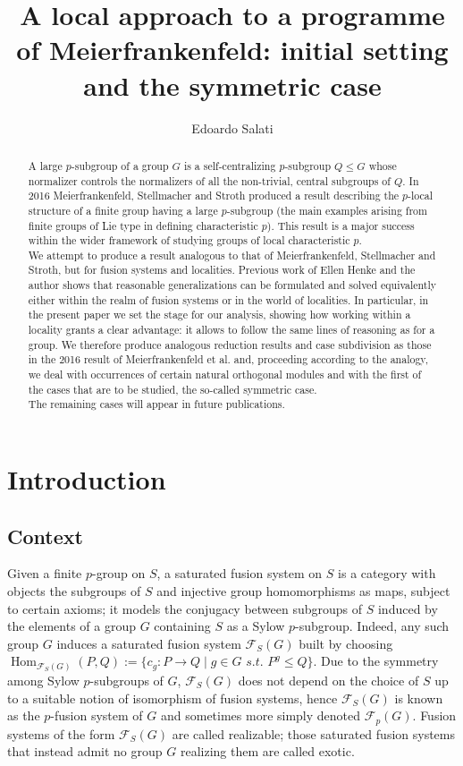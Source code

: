\documentclass{amsart}
\title[A local approach to a programme of Meierfrankenfeld I]{A local approach to a programme of Meierfrankenfeld: initial setting and the symmetric case}
\author{Edoardo Salati}
\numberwithin{equation}{section}
\theoremstyle{definition}
\theoremstyle{subresult}
\theoremstyle{caseresult}
\newcommand{\F}{\mathcal{F}}
\newcommand{\Hom}{\operatorname{Hom}}
\newcommand{\<}{\langle}
\renewcommand{\>}{\rangle}
\begin{document}
\maketitle

\begin{abstract}
	\noindent
    A large $p$-subgroup of a group $G$ is a self-centralizing $p$-subgroup $Q \le G$ whose normalizer controls the normalizers of all the non-trivial, central subgroups of $Q$. In 2016 Meierfrankenfeld, Stellmacher and Stroth produced a result describing the $p$-local structure of a finite group having a large $p$-subgroup (the main examples arising from finite groups of Lie type in defining characteristic $p$). This result is a major success within the wider framework of studying groups of local characteristic $p$.\\
    We attempt to produce a result analogous to that of Meierfrankenfeld, Stellmacher and Stroth, but for fusion systems and localities. Previous work of Ellen Henke and the author shows that reasonable generalizations can be formulated and solved equivalently either within the realm of fusion systems or in the world of localities. In particular, in the present paper we set the stage for our analysis, showing how working within a locality grants a clear advantage: it allows to follow the same lines of reasoning as for a group. We therefore produce analogous reduction results and case subdivision as those in the 2016 result of Meierfrankenfeld et al. and, proceeding according to the analogy, we deal with occurrences of certain natural orthogonal modules and with the first of the cases that are to be studied, the so-called symmetric case.\\
    The remaining cases will appear in future publications.
\end{abstract}

\setlength{\parindent}{0pt}

\section{Introduction}
\subsection{Context}
Given a finite $p$-group on $S$, a saturated fusion system on $S$ is a category with objects the subgroups of $S$ and injective group homomorphisms as maps, subject to certain axioms; it models the conjugacy between subgroups of $S$ induced by the elements of a group $G$ containing $S$ as a Sylow $p$-subgroup. Indeed, any such group $G$ induces a saturated fusion system $\F_S(G)$ built by choosing $\Hom_{\F_S(G)}(P,Q) := \{c_g \colon P \to Q \mid g \in G \textit{ s.t. } P^g \le Q \}$. Due to the symmetry among Sylow $p$-subgroups of $G$, $\F_S(G)$ does not depend on the choice of $S$ up to a suitable notion of isomorphism of fusion systems, hence $\F_S(G)$ is known as the $p$-fusion system of $G$ and sometimes more simply denoted $\F_p(G)$. Fusion systems of the form $\F_S(G)$ are called realizable; those saturated fusion systems that instead admit no group $G$ realizing them are called exotic.\\
\end{document}
